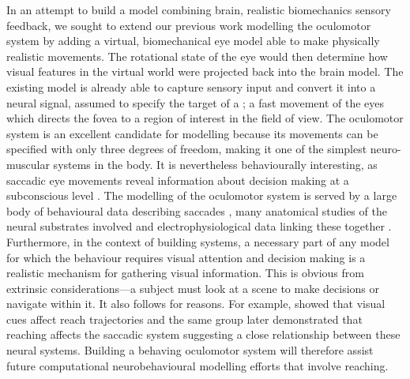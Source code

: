 \documentclass{frontiersSCNS}
\begin{document}
In an attempt to build a model combining brain, realistic
biomechanics  sensory feedback, we sought to extend our
previous work modelling the oculomotor system by adding a virtual,
biomechanical eye model able to make physically realistic
movements. The rotational state of the eye would then determine how
visual features in the virtual world were projected back into the
brain model.
%
The existing
model \citep{cope_basal_2017} is already able to capture sensory input
and convert it into a neural signal, assumed to specify the target of
a ; a fast movement of the eyes which directs
the fovea to a region of interest in the field of view.
%
The oculomotor system is an excellent candidate for modelling because
its movements can be specified with only three degrees of freedom,
making it one of the simplest neuro-muscular systems in the body.
%
It is nevertheless behaviourally interesting, as saccadic eye
movements reveal information about decision making at a subconscious
level
\citep{deubel_saccade_1996,reppert_modulation_2015,marcos_determining_2016}.
The modelling of the oculomotor system is served by a large body of
behavioural data describing
saccades \citep{tipper_reaching_2001,walker_effect_1997,casteau_effect_2012},
many anatomical studies of the neural substrates involved
\citep{meredith_intrinsic_1998,isa_intrinsic_2002,isa_exploring_2009}
and electrophysiological data linking these together
\citep{hepp_spatio-temporal_1983,dorris_neuronal_1997,mcpeek_competition_2003,vokoun_circuit_2011}.
Furthermore, in the context of building  systems, a
necessary part of any model for which the behaviour requires visual
attention and decision making is a realistic mechanism for gathering
visual information.  This is obvious from extrinsic considerations---a
subject must look at a scene to make decisions or navigate within
it. It also follows for  reasons. For
example, \cite{howard_hand_1997} showed that visual cues affect reach
trajectories and the same group later demonstrated that reaching
affects the saccadic system
\citep{tipper_reaching_2001} suggesting a close relationship between these
neural systems. Building a behaving oculomotor system will
therefore assist future computational neurobehavioural modelling
efforts that involve reaching.
\end{document}
